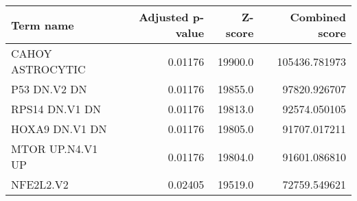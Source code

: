 \begin{tabular}{lrrr}
\toprule
       Term name &  Adjusted p-value &  Z-score &  Combined score \\
\midrule
CAHOY ASTROCYTIC &           0.01176 &  19900.0 &   105436.781973 \\
    P53 DN.V2 DN &           0.01176 &  19855.0 &    97820.926707 \\
  RPS14 DN.V1 DN &           0.01176 &  19813.0 &    92574.050105 \\
  HOXA9 DN.V1 DN &           0.01176 &  19805.0 &    91707.017211 \\
MTOR UP.N4.V1 UP &           0.01176 &  19804.0 &    91601.086810 \\
       NFE2L2.V2 &           0.02405 &  19519.0 &    72759.549621 \\
\bottomrule
\end{tabular}
